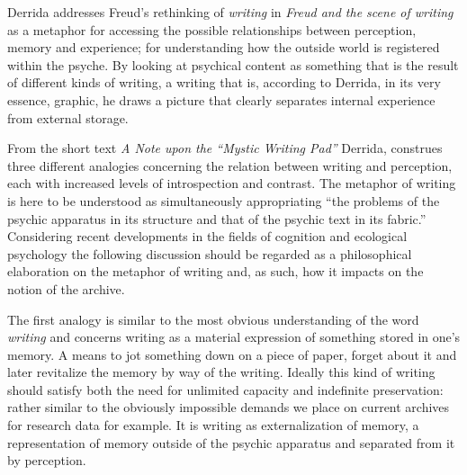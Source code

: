 \documentclass[11pt,a4paper]{article}
\begin{document}
Derrida addresses Freud's rethinking of \emph{writing} in \emph{Freud and the scene of writing} as a metaphor for accessing the possible relationships between perception, memory and experience; for understanding how the outside world is registered within the psyche. By looking at psychical content as something that is the result of different kinds of writing, a writing that is, according to Derrida, in its very essence, graphic, he draws a picture that clearly separates internal experience from external storage.


From the short text \emph{A Note upon the “Mystic Writing Pad”} \citep[Included in:][p. 207-12]{freud1997} Derrida,  construes three different analogies concerning the relation between writing and perception, each with increased levels of introspection and contrast. The metaphor of writing is here to be understood as simultaneously appropriating ``the problems of the psychic apparatus in its structure and that of the psychic text in its fabric.'' \citep[p. 259]{der78} Considering recent developments in the fields of cognition and ecological psychology the following discussion should be regarded as a philosophical elaboration on the metaphor of writing and, as such, how it impacts on the notion of the archive.

The first analogy is similar to the most obvious understanding of the word \emph{writing} and concerns writing as a material expression of something stored in one's memory. A means to jot something down on a piece of paper, forget about it and later revitalize the memory by way of the writing. Ideally this kind of writing should satisfy both the need for unlimited capacity and indefinite preservation: rather similar to the obviously impossible demands we place on current archives for research data for example. It is writing as externalization of memory, a representation of memory outside of the psychic apparatus and separated from it by perception.
\end{document}
